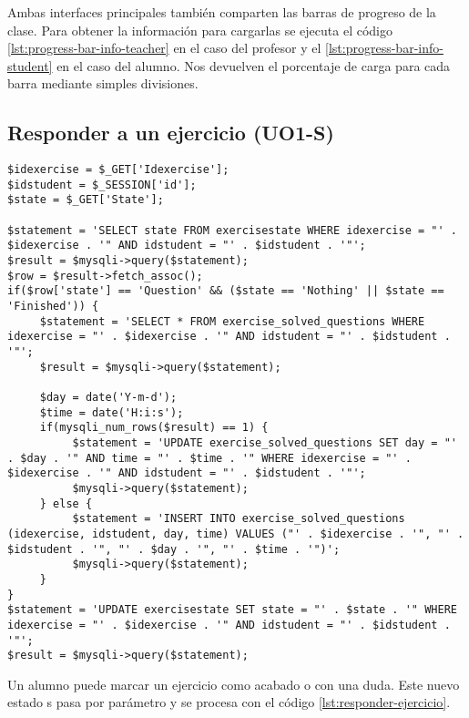 Ambas interfaces principales también comparten las barras de progreso de la clase. Para obtener la información para cargarlas se ejecuta el código \ref{lst:progress-bar-info-teacher} en el caso del profesor y el \ref{lst:progress-bar-info-student} en el caso del alumno. Nos devuelven el porcentaje de carga para cada barra mediante simples divisiones.\\

\subsection{Responder a un ejercicio (UO1-S)}
\label{diseno-e-implementacion:logica-negocio:responder-ejercicio}

\noindent
\begin{lstlisting}[caption=Responder a un ejercicio.,label={lst:responder-ejercicio}]
$idexercise = $_GET['Idexercise'];
$idstudent = $_SESSION['id'];
$state = $_GET['State'];

$statement = 'SELECT state FROM exercisestate WHERE idexercise = "' . $idexercise . '" AND idstudent = "' . $idstudent . '"';
$result = $mysqli->query($statement);
$row = $result->fetch_assoc();
if($row['state'] == 'Question' && ($state == 'Nothing' || $state == 'Finished')) {
     $statement = 'SELECT * FROM exercise_solved_questions WHERE idexercise = "' . $idexercise . '" AND idstudent = "' . $idstudent . '"';
     $result = $mysqli->query($statement);
	
     $day = date('Y-m-d');
     $time = date('H:i:s');
     if(mysqli_num_rows($result) == 1) {
          $statement = 'UPDATE exercise_solved_questions SET day = "' . $day . '" AND time = "' . $time . '" WHERE idexercise = "' . $idexercise . '" AND idstudent = "' . $idstudent . '"';
          $mysqli->query($statement);
     } else {
          $statement = 'INSERT INTO exercise_solved_questions (idexercise, idstudent, day, time) VALUES ("' . $idexercise . '", "' . $idstudent . '", "' . $day . '", "' . $time . '")';
          $mysqli->query($statement);
     }
}
$statement = 'UPDATE exercisestate SET state = "' . $state . '" WHERE idexercise = "' . $idexercise . '" AND idstudent = "' . $idstudent . '"';
$result = $mysqli->query($statement);
\end{lstlisting}

Un alumno puede marcar un ejercicio como acabado o con una duda. Este nuevo estado s pasa por parámetro y se procesa con el código \ref{lst:responder-ejercicio}.\\

